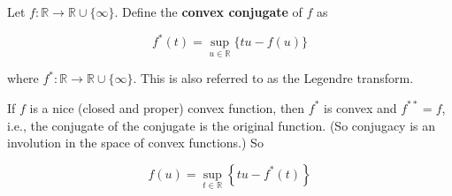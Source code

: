 \begin{definition}
    Let $f: \mathbb{R} \rightarrow \mathbb{R} \cup\{\infty\}$. Define the \textbf{convex conjugate} of $f$ as

    $$
    f^{*}(t)=\sup _{u \in \mathbb{R}}\{t u-f(u)\}
    $$

    where $f^{*}: \mathbb{R} \rightarrow \mathbb{R} \cup\{\infty\}$. This is also referred to as the Legendre transform.

    If $f$ is a nice (closed and proper) convex function, then $f^{*}$ is convex and $f^{* *}=f$, i.e., the conjugate of the conjugate is the original function. (So conjugacy is an involution in the space of convex functions.) So

    $$
    f(u)=\sup _{t \in \mathbb{R}}\left\{t u-f^{*}(t)\right\}
    $$
\end{definition}

